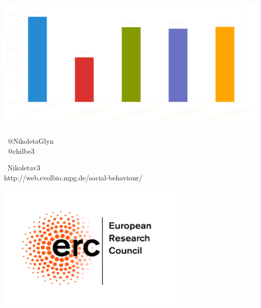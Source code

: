 \documentclass{beamer}
\begin{document}
\begin{frame}
    \centering
    
\end{frame}

\begin{frame}
    \centering
    \includegraphics[width=\textwidth]{static/results_five.png}
\end{frame}

\begin{frame}
    \begin{center}
    \faTwitter \ @NikoletaGlyn \\
    \faTwitter \ @chilbe3 \\
    \vspace{1cm}

    \faGithub \ Nikoleta\-v3 \\
    http://web.evolbio.mpg.de/social-behaviour/ \\
    \vspace{1cm}

    \includegraphics[width=.3\textwidth]{static/erc.png}
    \end{center}
\end{frame}
\end{document}

